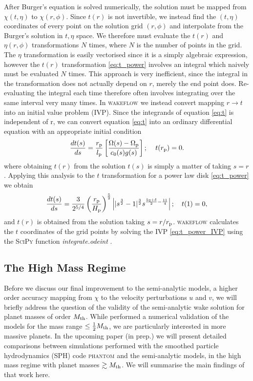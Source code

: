After Burger's equation is solved numerically, the solution must be mapped from $\chi(t,\eta)$ to $\chi(r,\phi)$.
Since $t(r)$ is not invertible, we instead find the $(t,\eta)$ coordinates of every point on the solution grid $(r,\phi)$ and interpolate from the Burger's solution in $t,\eta$ space.
We therefore must evaluate the $t(r)$ and $\eta(r,\phi)$ transformations $N$ times, where $N$ is the number of points in the grid.
The $\eta$ transformation is easily vectorised since it is a simply algebraic expression, however the $t(r)$ transformation \ref{eq:t_power} involves an integral which naively must be evaluated $N$ times.
This approach is very inefficient, since the integral in the transformation does not actually depend on $r$, merely the end point does.
Re-evaluating the integral each time therefore often involves integrating over the same interval very many times.
In \textsc{wakeflow} we instead convert mapping $r\rightarrow t$ into an initial value problem (IVP).
Since the integrands of equation \ref{eq:t} is independent of r, we can convert equation \ref{eq:t} into an ordinary differential equation with an appropriate initial condition
\begin{align}
    \frac{dt(s)}{ds} = \frac{r_{\rm p}}{l_{\rm p}} \left[ \frac{\Omega(s) - \Omega_{\rm p}}{c_0(s) g(s)} \right]; \quad \, t(r_{\rm p}) = 0.
\end{align}
where obtaining $t(r)$ from the solution $t(s)$ is simply a matter of taking $s=r$.
Applying this analysis to the $t$ transformation for a power law disk \ref{eq:t_power} we obtain 
\begin{align}
    \frac{dt(s)}{ds} = \frac{3}{2^{5/4}} \left( \frac{r_{\rm p}}{H_{\rm p}} \right)^{\frac{5}{2}} \left| |s^\frac{3}{2} - 1|^\frac{3}{2} s^{\frac{5q+\delta}{2}-\frac{11}{4}} \right|; \quad t(1)=0, \label{eq:t_power_IVP}
\end{align}
and $t(r)$ is obtained from the solution taking $s=r/r_{\rm p}$.
\textsc{wakeflow} calculates the $t$ coordinates of the grid points by solving the IVP \ref{eq:t_power_IVP} using the \textsc{SciPy} function \textit{integrate.odeint} \citep{virtanen2020}.

\subsection{The High Mass Regime} \label{sec:high_mass}

Before we discuss our final improvement to the semi-analytic models, a higher order accuracy mapping from $\chi$ to the velocity perturbations $u$ and $v$, we will briefly address the question of the validity of the semi-analytic wake solution for planet masses of order $M_{\rm th}$.
While \citet{cimerman2021} performed a numerical validation of the models for the mass range $\le \frac{1}{2} M_{\rm th}$, we are particularly interested in more massive planets.
In the upcoming paper \citeauthor{fasanoinprep.} (in prep.) we will present detailed comparisons between simulations performed with the smoothed particle hydrodynamics (SPH) code \textsc{phantom} \citep{price2018} and the semi-analytic models, in the high mass regime with planet masses $\gtrsim M_{\rm th}$.
We will summarise the main findings of that work here.

